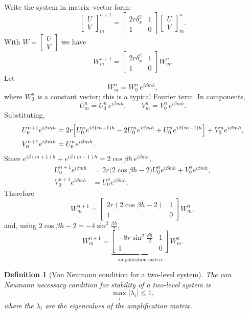 \documentclass[11pt,a4paper]{article}
\numberwithin{equation}{section}
\theoremstyle{spacedplain}
\theoremstyle{spaceddefinition}
\newtheorem{definition}[theorem]{Definition}
\theoremstyle{spacedremark}
\begin{document}
Write the system in matrix--vector form:
\[
  \begin{bmatrix}U\\ V\end{bmatrix}_m^{n+1}
  =\begin{bmatrix}2r\delta_x^2&1\\ 1&0\end{bmatrix}
   \begin{bmatrix}U\\ V\end{bmatrix}_m^{n}.
\]
With \(W=\begin{bmatrix}U\\ V\end{bmatrix}\) we have
\[
  W_m^{n+1}=\begin{bmatrix}2r\delta_x^2&1\\ 1&0\end{bmatrix}W_m^n .
\]
Let
\[
  W_m^n=W_0^n\,e^{i\beta mh},
\]
where \(W_0^n\) is a constant vector; this is a typical Fourier term.
In components,
\[
  U_m^n=U_0^n\,e^{i\beta mh},
  \qquad
  V_m^n=V_0^n\,e^{i\beta mh}.
\]
Substituting,
\begin{align*}
  U_0^{n+1}e^{i\beta mh}
  &=2r\Bigl[U_0^ne^{i\beta(m+1)h}-2U_0^ne^{i\beta mh}
    +U_0^ne^{i\beta(m-1)h}\Bigr]+V_0^ne^{i\beta mh},\\
  V_0^{n+1}e^{i\beta mh}&=U_0^ne^{i\beta mh}.
\end{align*}
Since \(e^{i\beta(m+1)h}+e^{i\beta(m-1)h}=2\cos\beta h\,e^{i\beta mh}\),
\begin{align*}
  U_0^{n+1}e^{i\beta mh}
  &=2r\bigl(2\cos\beta h-2\bigr)U_0^ne^{i\beta mh}+V_0^ne^{i\beta mh},\\
  V_0^{n+1}e^{i\beta mh}&=U_0^ne^{i\beta mh}.
\end{align*}
Therefore
\[
  W_m^{n+1}=\begin{bmatrix}2r(2\cos\beta h-2)&1\\ 1&0\end{bmatrix}W_m^n,
\]
and, using \(2\cos\beta h-2=-4\sin^2\frac{\beta h}2\),
\[
  W_m^{n+1}=\underbrace{\begin{bmatrix}-8r\sin^2\frac{\beta h}2&1\\[2pt] 1&0\end{bmatrix}}_{\text{amplification matrix}}W_m^n .
\]

\begin{definition}[Von Neumann condition for a two-level system]
The von Neumann necessary condition for stability of a two-level
system is
\[
  \max_{i}|\lambda_i|\le1,
\]
where the \(\lambda_i\) are the eigenvalues of the amplification
matrix.
\end{definition}
\end{document}
